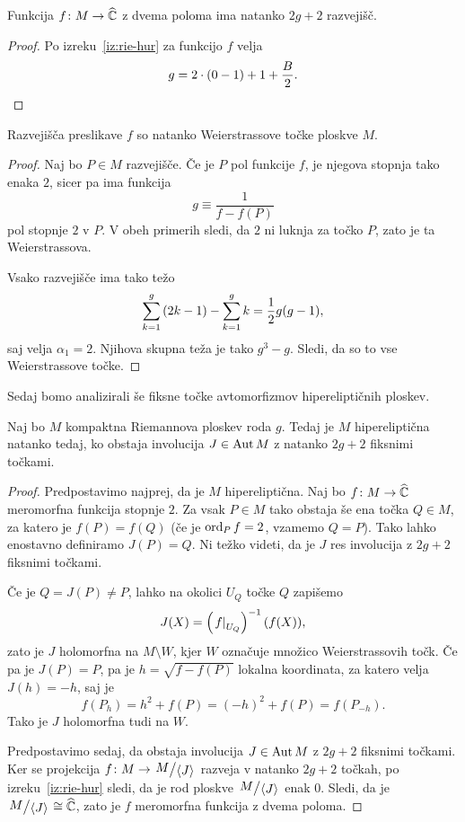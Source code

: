 \begin{trditev}
Funkcija $f \colon M \to \widehat{\mathbb{C}}$ z dvema poloma ima natanko $2g+2$
razvejišč.
\end{trditev}

\begin{proof}
Po izreku~\ref{iz:rie-hur} za funkcijo $f$ velja
\[
g = 2 \cdot (0-1) + 1 + \frac{B}{2}. \qedhere
\]
\end{proof}

\begin{trditev}
Razvejišča preslikave $f$ so natanko Weierstrassove točke ploskve
$M$.
\end{trditev}

\begin{proof}
Naj bo $P \in M$ razvejišče. Če je $P$ pol funkcije $f$, je njegova
stopnja tako enaka $2$, sicer pa ima funkcija
\[
g \equiv \frac{1}{f - f(P)}
\]
pol stopnje $2$ v $P$. V obeh primerih sledi, da $2$ ni luknja za
točko $P$, zato je ta Weierstrassova.

Vsako razvejišče ima tako težo
\[
\sum_{k=1}^g \left(2k-1\right) - \sum_{k=1}^g k = \frac{1}{2} g (g-1),
\]
saj velja $\alpha_1 = 2$. Njihova skupna teža je tako $g^3 - g$.
Sledi, da so to vse Weierstrassove točke.
\end{proof}

Sedaj bomo analizirali še fiksne točke avtomorfizmov
hipereliptičnih ploskev.

\begin{trditev}
Naj bo $M$ kompaktna Riemannova ploskev roda $g$. Tedaj je $M$
hipereliptična natanko tedaj, ko obstaja involucija $J \in \operatorname{Aut} M$
z natanko $2g + 2$ fiksnimi točkami.
\end{trditev}

\begin{proof}
Predpostavimo najprej, da je $M$ hipereliptična. Naj bo
$f \colon M \to \widehat{\mathbb{C}}$ meromorfna funkcija stopnje $2$. Za vsak
$P \in M$ tako obstaja še ena točka $Q \in M$, za katero je
$f(P) = f(Q)$ (če je $\operatorname{ord}_P f = 2$, vzamemo $Q=P$). Tako lahko
enostavno definiramo $J(P) = Q$. Ni težko videti, da je $J$
res involucija z $2g + 2$ fiksnimi točkami.

Če je $Q = J(P) \ne P$, lahko na okolici $U_Q$ točke $Q$ zapišemo
\[
J(X) = \left(\left. f\right|_{U_Q}^{}\right)^{-1}(f(X)),
\]
zato je $J$ holomorfna na $M \setminus W$, kjer $W$ označuje
množico Weierstrassovih točk. Če pa je $J(P) = P$, pa je
$h = \sqrt{f - f(P)}$ lokalna koordinata, za katero velja
$J(h) = -h$, saj je
\[
f(P_h) = h^2 + f(P) = (-h)^2 + f(P) = f(P_{-h}).
\]
Tako je $J$ holomorfna tudi na $W$.

Predpostavimo sedaj, da obstaja involucija $J \in \operatorname{Aut} M$ z
$2g + 2$ fiksnimi točkami. Ker se projekcija
$f \colon M \to \kvoc{M}{\skl{J}}$ razveja v natanko $2g + 2$
točkah, po izreku~\ref{iz:rie-hur} sledi, da je rod ploskve
$\kvoc{M}{\skl{J}}$ enak $0$. Sledi, da je
$\kvoc{M}{\skl{J}} \cong \rs$, zato je $f$ meromorfna funkcija z
dvema poloma.
\end{proof}

